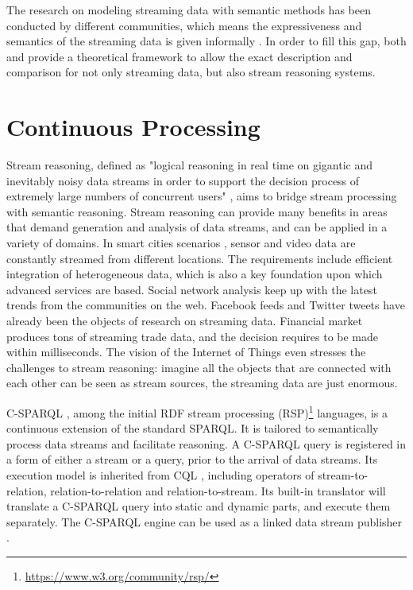 The research on modeling streaming data with semantic methods has been conducted by different communities, which means the expressiveness and semantics of the streaming data is given informally \cite{della2009s}.
In order to fill this gap, both \cite{beck2015towards} and \cite{beck2015lars} provide a theoretical framework to allow the exact description and comparison for not only streaming data, but also stream reasoning systems.
%
\section{Continuous Processing}
Stream reasoning, defined as "logical reasoning in real time on gigantic and inevitably noisy data streams in order to support the decision process of extremely large numbers of concurrent users" \cite{stuckenschmidt2010towards}, aims to bridge stream processing with semantic reasoning. 
Stream reasoning can provide many benefits in areas that demand generation and analysis of data streams, and can be applied in a variety of domains.
In smart cities scenarios \cite{tallevi2013real} \cite{lecue2012capturing}, sensor and video data are constantly streamed from different locations.
The requirements include efficient integration of heterogeneous data, which is also a key foundation upon which advanced services are based. 
Social network analysis \cite{barbieri2009continuous} keep up with the latest trends from the communities on the web.
Facebook feeds and Twitter tweets have already been the objects of research on streaming data.
Financial market \cite{stonebraker20058} produces tons of streaming trade data, and the decision requires to be made within milliseconds.
The vision of the Internet of Things \cite{atzori2010internet} even stresses the challenges to stream reasoning: imagine all the objects that are connected with each other can be seen as stream sources, the streaming data are just enormous. 

C-SPARQL \cite{barbieri2009c}, among the initial RDF stream processing (RSP)\footnote{\url{https://www.w3.org/community/rsp/}} languages, is a continuous extension of the standard SPARQL. 
It is tailored to semantically process data streams and facilitate reasoning. 
A C-SPARQL query is registered in a form of either a stream or a query, prior to the arrival of data streams.
Its execution model is inherited from CQL \cite{arasu2006cql}, including operators of stream-to-relation, relation-to-relation and relation-to-stream. 
Its built-in translator will translate a C-SPARQL query into static and dynamic parts, and execute them separately. 
The C-SPARQL engine can be used as a linked data stream publisher \cite{barbieri2010proposal}. 

